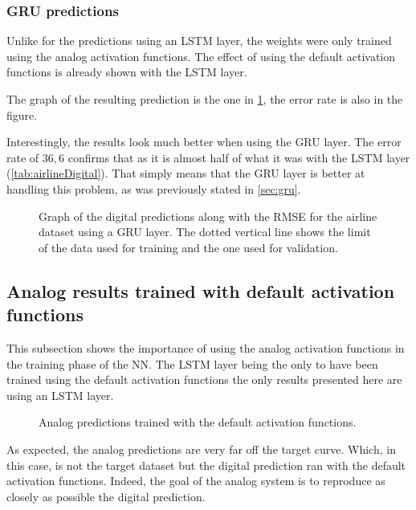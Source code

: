 \subsubsection{\acs{GRU} predictions}

Unlike for the predictions using an \ac{LSTM} layer, the weights were only trained using the analog activation functions. The effect of using the default activation functions is already shown with the \ac{LSTM} layer.

The graph of the resulting prediction is the one in \cref{graph:airlineDigitalGRU}, the error rate is also in the figure.

Interestingly, the results look much better when using the \ac{GRU} layer. The error rate of $36,6$ confirms that as it is almost half of what it was with the \ac{LSTM} layer (\cref{tab:airlineDigital}). That simply means that the \ac{GRU} layer is better at handling this problem, as was previously stated in \cref{sec:gru}.

\begin{figure}[H]
  \centering
  
  \caption{Graph of the digital predictions along with the \ac{RMSE} for the airline dataset using a \ac{GRU} layer. The dotted vertical line shows the limit of the data used for training and the one used for validation.}
  \label{graph:airlineDigitalGRU}
\end{figure}

\subsection{Analog results trained with default activation functions}\label{subsec:airlineAnalogNoC}

This subsection shows the importance of using the analog activation functions in the training phase of the \ac{NN}. The \ac{LSTM} layer being the only to have been trained using the default activation functions the only results presented here are using an \ac{LSTM} layer.

\begin{figure}[H]
  \centering
  
  \caption{Analog predictions trained with the default activation functions.}
  \label{graph:airlineAnalogNoC}
\end{figure}

As expected, the analog predictions are very far off the target curve. Which, in this case, is not the target dataset but the digital prediction ran with the default activation functions. Indeed, the goal of the analog system is to reproduce as closely as possible the digital prediction.

